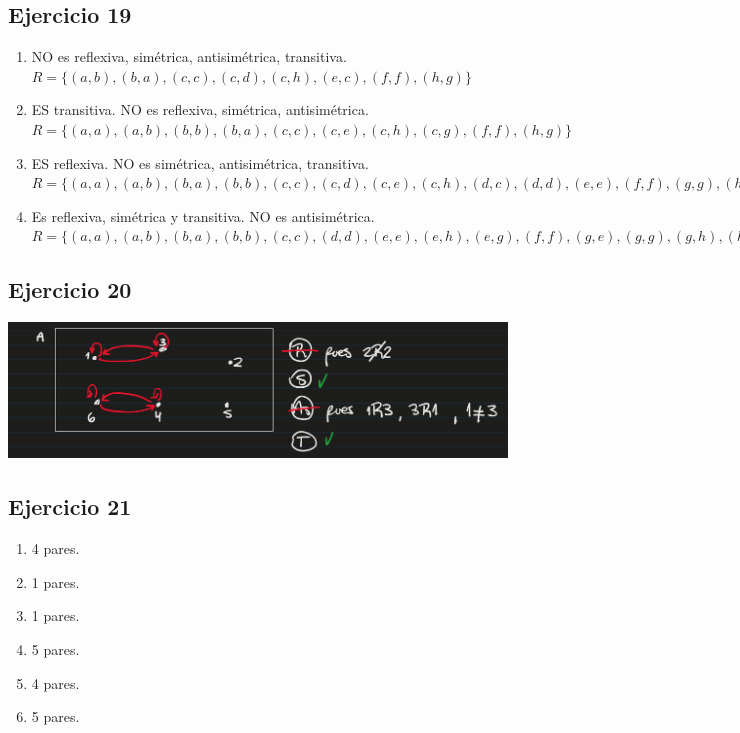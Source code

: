 \subsection{Ejercicio 19}
\begin{enumerate}[label=(\alph*)]
    \item NO es reflexiva, simétrica, antisimétrica, transitiva.\\
        $R = \{ (a,b), (b,a), (c,c), (c,d), (c,h), (e,c), (f,f), (h,g) \}$
    \item ES transitiva. NO es reflexiva, simétrica, antisimétrica.\\ 
        $R = \{ (a,a), (a,b), (b,b), (b,a), (c,c), (c,e), (c,h), (c,g), (f,f), (h,g) \}$
    \item ES reflexiva. NO es simétrica, antisimétrica, transitiva.\\
        $R = \{ (a,a), (a,b), (b,a), (b,b), (c,c), (c,d), (c,e), (c,h), (d,c), (d,d), (e,e), (f,f), (g,g), (h,h), (h,g) \}$
    \item Es reflexiva, simétrica y transitiva. NO es antisimétrica. \\
        $R = \{ (a,a), (a,b), (b,a), (b,b), (c,c), (d,d), (e,e), (e,h), (e,g), (f,f), (g,e), (g,g), (g,h), (h,h), (h,e), (h,g) \}$ 
\end{enumerate}

\subsection{Ejercicio 20}
\includegraphics[width=500px]{1.20}

\subsection{Ejercicio 21}
\begin{enumerate}[label=(\alph*)]
    \item 4 pares.
    \item 1 pares.
    \item 1 pares.
    \item 5 pares.
    \item 4 pares.
    \item 5 pares.
\end{enumerate}

